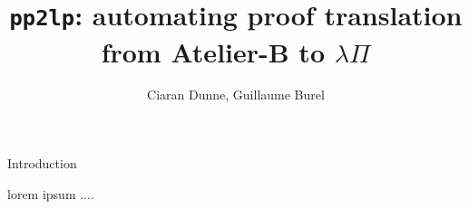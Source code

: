 \documentclass{beamer}
\title{
  \texttt{pp2lp}:
    automating proof translation
    from Atelier-B to $λΠ$}
\author{Ciaran Dunne, Guillaume Burel}
\begin{document}
\maketitle

\begin{frame}{Introduction}

	lorem ipsum ....

\end{frame}
\end{document}

